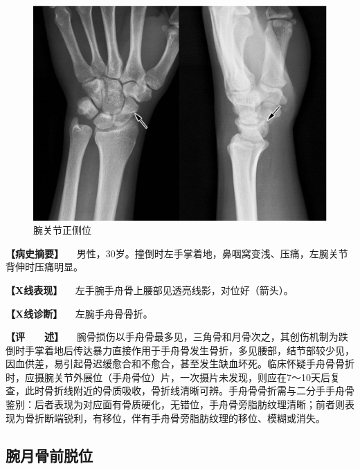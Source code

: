 \begin{figure}[!htbp]
 \centering
 \includegraphics{./images/Image00039.jpg}
 \captionsetup{justification=centering}
 \caption{腕关节正侧位}
 \label{fig2-3-12}
  \end{figure} 

\textbf{【病史摘要】}
　男性，30岁。撞倒时左手掌着地，鼻咽窝变浅、压痛，左腕关节背伸时压痛明显。

\textbf{【X线表现】} 　左手腕手舟骨上腰部见透亮线影，对位好（箭头）。

\textbf{【X线诊断】} 　左腕手舟骨骨折。

\textbf{【评　　述】}
　腕骨损伤以手舟骨最多见，三角骨和月骨次之，其创伤机制为跌倒时手掌着地后传达暴力直接作用于手舟骨发生骨折，多见腰部，结节部较少见，因血供差，易引起骨迟缓愈合和不愈合，甚至发生缺血坏死。临床怀疑手舟骨骨折时，应摄腕关节外展位（手舟骨位）片，一次摄片未发现，则应在7～10天后复查，此时骨折线附近的骨质吸收，骨折线清晰可辨。手舟骨骨折需与二分手手舟骨鉴别：后者表现为对应面有骨质硬化，无错位，手舟骨旁脂肪纹理清晰；前者则表现为骨折断端锐利，有移位，伴有手舟骨旁脂肪纹理的移位、模糊或消失。

\subsection{腕月骨前脱位}

